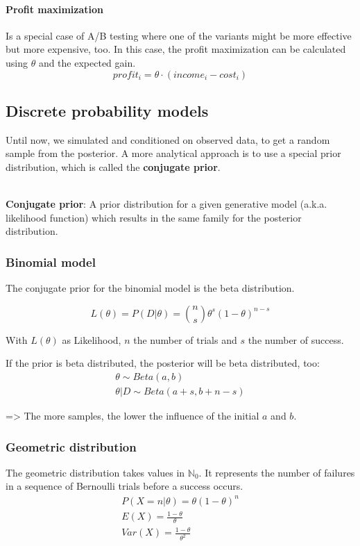 \paragraph{Profit maximization}
Is a special case of A/B testing where one of the variants might be more effective but more expensive, too. In this case, the profit maximization can be calculated using $\theta$ and the expected gain.
\begin{equation*}
profit_i = \theta \cdot (income_i - cost_i)
\end{equation*}

\subsection{Discrete probability models}
Until now, we simulated and conditioned on observed data, to get a random sample from the posterior. A more analytical approach is to use a special prior distribution, which is called the \textbf{conjugate prior}.

\mbox{}\\
\textbf{Conjugate prior}: A prior distribution for a given generative model (a.k.a. likelihood function) which results in the same family for the posterior distribution.

\subsubsection{Binomial model}
The conjugate prior for the binomial model is the beta distribution.

\begin{equation*}
	L(\theta) = P(D|\theta) = {{n}\choose{s}}\theta^s(1-\theta)^{n-s}
\end{equation*}

With $L(\theta)$ as Likelihood, $n$ the number of trials and $s$ the number of success.

If the prior is beta distributed, the posterior will be beta distributed, too:
\begin{gather*}
\theta\sim Beta(a, b)\\
\theta|D\sim Beta(a+s, b+n-s)
\end{gather*}

=> The more samples, the lower the influence of the initial $a$ and $b$.

\subsubsection{Geometric distribution}
The geometric distribution takes values in $\mathbb{N}_0$. It represents the number of failures in a sequence of Bernoulli trials before a success occurs.
\begin{gather*}
P(X=n|\theta) = \theta(1-\theta)^n\\
E(X) = \frac{1-\theta}{\theta}\\
Var(X) = \frac{1-\theta}{\theta^2}
\end{gather*}

